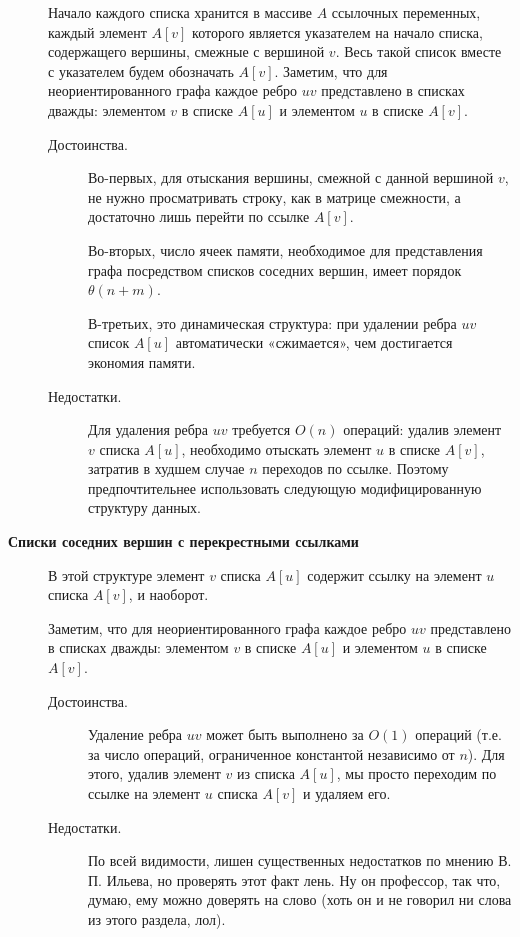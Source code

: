 \begin{note}
\begin{description}
              Начало каждого списка хранится в массиве $ A $ ссылочных переменных, каждый элемент $ A[v] $ которого является указателем на начало списка, содержащего вершины, смежные с вершиной $ v $. Весь такой список вместе с указателем будем обозначать $ A[v] $.
              Заметим, что для неориентированного графа каждое ребро $ uv $ представлено в списках дважды: элементом $ v $ в списке $ A[u] $ и элементом $ u $ в списке $ A[v] $.
              \begin{description}
                  \item[Достоинства.]
                        Во-первых, для отыскания вершины, смежной с данной вершиной $ v $, не нужно просматривать строку, как в матрице смежности, а достаточно лишь перейти по ссылке $ A[v] $.

                        Во-вторых, число ячеек памяти, необходимое для представления графа посредством списков соседних вершин, имеет порядок $ \theta(n + m) $.

                        В-третьих, это динамическая структура: при удалении ребра $ uv $ список $ A[u] $ автоматически «сжимается», чем достигается экономия памяти.
                  \item[Недостатки.] Для удаления ребра $ uv $ требуется $ O(n) $ операций: удалив элемент $ v $ списка $ A[u] $, необходимо отыскать элемент $ u $ в списке $ A[v] $, затратив в худшем случае $ n $ переходов по ссылке. Поэтому предпочтительнее использовать следующую модифицированную структуру данных.
              \end{description}

        \item[\circled{5} \textbf{Списки соседних вершин с перекрестными ссылками}]
              В этой структуре элемент $ v $ списка $ A[u] $ содержит ссылку на элемент $ u $ списка $ A[v] $, и наоборот.

              Заметим, что для неориентированного графа каждое ребро $ uv $ представлено в списках дважды: элементом $ v $ в списке $ A[u] $ и элементом $ u $ в списке $ A[v] $.
              \begin{description}
                  \item[Достоинства.]
                        Удаление ребра $ uv $ может быть выполнено за $ O(1) $ операций (т.е. за число операций, ограниченное константой независимо от $ n $).
                        Для этого, удалив элемент $ v $ из списка $ A[u] $, мы просто переходим по ссылке на элемент $ u $ списка $ A[v] $ и удаляем его.
                  \item[Недостатки.] По всей видимости, лишен существенных недостатков по мнению В. П. Ильева, но проверять этот факт лень. Ну он профессор, так что, думаю, ему можно доверять на слово (хоть он и не говорил ни слова из этого раздела, лол).
              \end{description}


\end{description}
\end{note}
